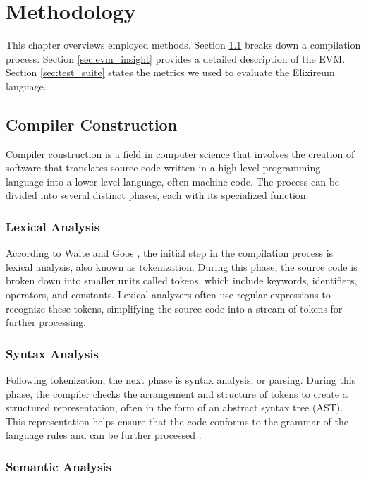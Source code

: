 \chapter{Methodology}
\label{chap:met}

This chapter overviews employed methods. Section \ref{sec:cc} breaks down a compilation process. Section \ref{sec:evm_insight} provides a detailed description of the EVM. Section \ref{sec:test_suite} states the metrics we used to evaluate the Elixireum language. 


\section{Compiler Construction}
\label{sec:cc}

Compiler construction is a field in computer science that involves the creation of software that translates source code written in a high-level programming language into a lower-level language, often machine code. The process can be divided into several distinct phases, each with its specialized function:

\subsection{Lexical Analysis}

According to Waite and Goos \cite[135-148]{CompilerConstruction}, the initial step in the compilation process is lexical analysis, also known as tokenization. During this phase, the source code is broken down into smaller units called tokens, which include keywords, identifiers, operators, and constants. Lexical analyzers often use regular expressions to recognize these tokens, simplifying the source code into a stream of tokens for further processing.

\subsection{Syntax Analysis}

Following tokenization, the next phase is syntax analysis, or parsing. During this phase, the compiler checks the arrangement and structure of tokens to create a structured representation, often in the form of an abstract syntax tree (AST). This representation helps ensure that the code conforms to the grammar of the language rules and can be further processed \cite[149-182]{CompilerConstruction}.

\subsection{Semantic Analysis}

